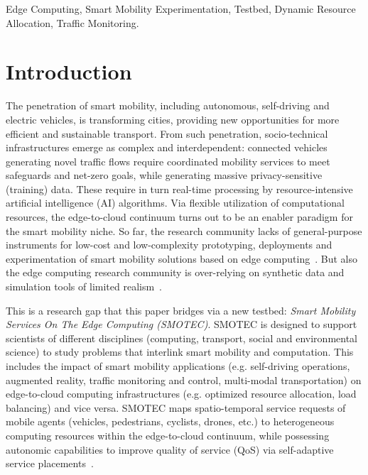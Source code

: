 \documentclass[conference]{IEEEtran}
\begin{document}
\begin{IEEEkeywords}
Edge Computing, Smart Mobility Experimentation, Testbed, Dynamic Resource Allocation, Traffic Monitoring. 
\end{IEEEkeywords}

\section{Introduction}

The penetration of smart mobility, including autonomous, self-driving and electric vehicles, is transforming cities, providing new opportunities for more efficient and sustainable transport. From such penetration, socio-technical infrastructures emerge as complex and interdependent: connected vehicles generating novel traffic flows require coordinated mobility services to meet safeguards and net-zero goals, while generating massive privacy-sensitive (training) data. These require in turn real-time processing by resource-intensive artificial intelligence (AI) algorithms. Via flexible utilization of computational resources, the edge-to-cloud continuum turns out to be an enabler paradigm for the smart mobility niche. So far, the research community lacks of general-purpose instruments for low-cost and low-complexity prototyping, deployments and experimentation of smart mobility solutions based on edge computing~\cite{berman2014geni,ertin2006kansei,keahey2020lessons}. But also the edge computing research community is over-relying on synthetic data and simulation tools of limited realism~\cite{carvalho2022can,svorobej2019simulating}.

This is a research gap that this paper bridges via a new testbed: \emph{Smart Mobility Services On The Edge Computing (SMOTEC)}. SMOTEC is designed to support scientists of different disciplines (computing, transport, social and environmental science) to study problems that interlink smart mobility and computation. This includes the impact of smart mobility applications (e.g. self-driving operations, augmented reality, traffic monitoring and control, multi-modal transportation) on edge-to-cloud computing infrastructures (e.g. optimized resource allocation, load balancing) and vice versa. SMOTEC maps spatio-temporal service requests of mobile agents (vehicles, pedestrians, cyclists, drones, etc.) to heterogeneous computing resources within the edge-to-cloud continuum, while possessing autonomic capabilities to improve quality of service (QoS) via self-adaptive service placements~\cite{Nezami2021}. 
\end{document}
